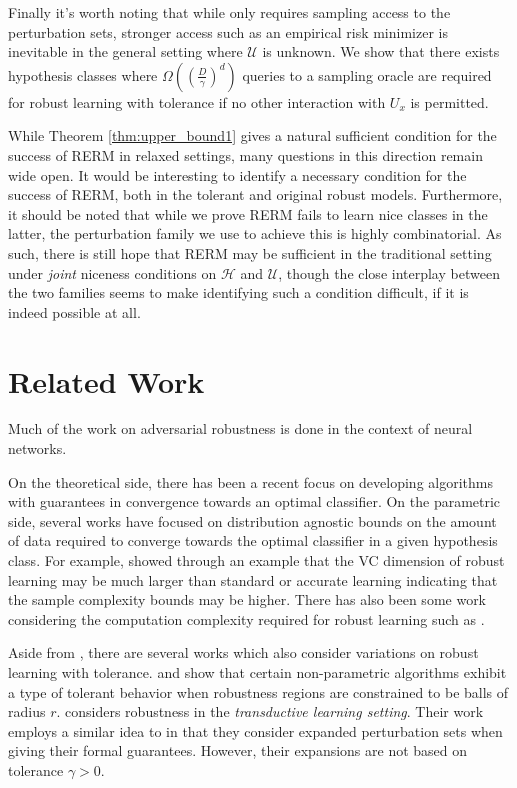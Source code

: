 Finally it's worth noting that while \citet{Urner22} only requires sampling access to the perturbation sets, stronger access such as an empirical risk minimizer is inevitable in the general setting where $\mathcal{U}$ is unknown. We show that there exists hypothesis classes where $\Omega((\frac{D}{\gamma})^d)$ queries to a sampling oracle are required for robust learning with tolerance if no other interaction with $U_x$ is permitted.

While Theorem \ref{thm:upper_bound1} gives a natural sufficient condition for the success of RERM in relaxed settings, many questions in this direction remain wide open. It would be interesting to identify a necessary condition for the success of RERM, both in the tolerant and original robust models. Furthermore, it should be noted that while we prove RERM fails to learn nice classes in the latter, the perturbation family we use to achieve this is highly combinatorial. As such, there is still hope that RERM may be sufficient in the traditional setting under \textit{joint} niceness conditions on $\mathcal{H}$ and $\mathcal{U}$, though the close interplay between the two families seems to make identifying such a condition difficult, if it is indeed possible at all.


\section{Related Work}

Much of the work on adversarial robustness \citep{Carlini17, Liu17, Papernot17, Papernot16, Szegedy14, Hein17, Katz17, Wu16,Steinhardt18, Sinha18} is done in the context of neural networks.

On the theoretical side, there has been a recent focus on developing algorithms with guarantees in convergence towards an optimal classifier. On the parametric side, several works \citep{loh18, attias19, Srebro19, bartlett19, pathak20, Cullina18} have focused on distribution agnostic bounds on the amount of data required to converge towards the optimal classifier in a given hypothesis class. For example, \citet{Srebro19} showed through an example that the VC dimension of robust learning may be much larger than standard or accurate learning indicating that the sample complexity bounds may be higher. There has also been some work considering the computation complexity required for robust learning such as \citet{Kane20}.


Aside from \citet{Urner22}, there are several works which also consider variations on robust learning with tolerance. \citet{YRWC19} and \citet{Bhattacharjee20} show that certain non-parametric algorithms exhibit a type of tolerant behavior when robustness regions are constrained to be balls of radius $r$. \citet{Omar22} considers robustness in the \textit{transductive learning setting}. Their work employs a similar idea to \citet{Urner22} in that they consider expanded perturbation sets when giving their formal guarantees. However, their expansions are not based on tolerance $\gamma > 0$.

